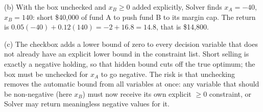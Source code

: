 (b) With the box unchecked and $x_B \geq 0$ added explicitly, Solver finds $x_A = -40$, $x_B = 140$: short \$40{,}000 of fund A to push fund B to its margin cap. The return is $0.05(-40) + 0.12(140) = -2 + 16.8 = 14.8$, that is \$14{,}800.

(c) The checkbox adds a lower bound of zero to every decision variable that does not already have an explicit lower bound in the constraint list. Short selling is exactly a negative holding, so that hidden bound cuts off the true optimum; the box must be unchecked for $x_A$ to go negative. The risk is that unchecking removes the automatic bound from all variables at once: any variable that should be non-negative (here $x_B$) must now receive its own explicit $\geq 0$ constraint, or Solver may return meaningless negative values for it.
